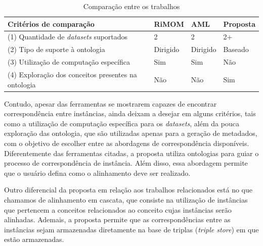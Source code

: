 \begin{table}[h]
	\centering
	\caption{Comparação entre os trabalhos}
	\label{tab:comparacao}
	\begin{tabular}{@{}llll}
		\toprule
		\textbf{Critérios de comparação}                    & \textbf{RiMOM} & \textbf{AML} & \textbf{Proposta} \\ \midrule
		(1) Quantidade de \textit{datasets} suportados    & 2              & 2            & 2+                \\
		(2) Tipo de suporte à ontologia                     & Dirigido       & Dirigido     & Baseado           \\
		(3) Utilização de computação específica             & Sim            & Sim          & Não               \\
		(4) Exploração dos conceitos presentes na ontologia & Não            & Não          & Sim               \\ \bottomrule
	\end{tabular}
\end{table}

Contudo, apesar das ferramentas se mostrarem capazes de encontrar correspondência entre instâncias, ainda deixam a desejar em alguns critérios, tais como a utilização de computação específica para os \textit{datasets}, além da pouca exploração das ontologia, que são utilizadas apenas para a geração de metadados, com o objetivo de escolher entre as abordagens de correspondência disponíveis. Diferentemente das ferramentas citadas, a proposta utiliza ontologias para guiar o processo de correspondência de instância. Além disso, essa abordagem permite que o usuário defina como o alinhamento deve ser realizado.

Outro diferencial da proposta em relação aos trabalhos relacionados está no que chamamos de alinhamento em cascata, que consiste na utilização de instâncias que pertencem a conceitos relacionados ao conceito cujas instâncias serão alinhadas. Ademais, a proposta permite que as correspondências entre as instâncias sejam armazenadas diretamente na base de triplas (\textit{triple store}) em que estão armazenadas.